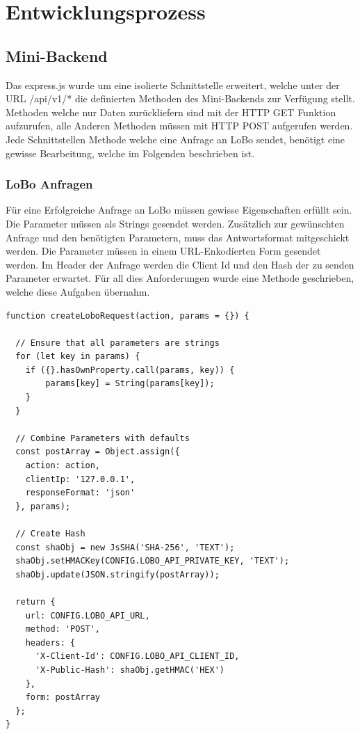 \section{Entwicklungsprozess}
\subsection{Mini-Backend}
Das express.js wurde um eine isolierte Schnittstelle erweitert, welche unter der URL /api/v1/* die definierten Methoden des Mini-Backends zur Verfügung stellt. Methoden welche nur Daten zurückliefern sind mit der HTTP GET Funktion aufzurufen, alle Anderen Methoden müssen mit HTTP POST aufgerufen werden. Jede Schnittstellen Methode welche eine Anfrage an LoBo sendet, benötigt eine gewisse Bearbeitung, welche im Folgenden beschrieben ist.

\subsubsection{LoBo Anfragen}
Für eine Erfolgreiche Anfrage an LoBo müssen gewisse Eigenschaften erfüllt sein. Die Parameter müssen als Strings gesendet werden. Zusätzlich zur gewünschten Anfrage und den benötigten Parametern, muss das Antwortsformat mitgeschickt werden. Die Parameter müssen in einem URL-Enkodierten Form gesendet werden. Im Header der Anfrage werden die Client Id und den Hash der zu senden Parameter erwartet. Für all dies Anforderungen wurde eine Methode geschrieben, welche diese Aufgaben übernahm.

\begin{lstlisting}[caption=Methode für LoBo Anfragen]
function createLoboRequest(action, params = {}) {

  // Ensure that all parameters are strings
  for (let key in params) {
    if ({}.hasOwnProperty.call(params, key)) {
        params[key] = String(params[key]);
    }
  }

  // Combine Parameters with defaults
  const postArray = Object.assign({
    action: action,
    clientIp: '127.0.0.1',
    responseFormat: 'json'
  }, params);

  // Create Hash
  const shaObj = new JsSHA('SHA-256', 'TEXT');
  shaObj.setHMACKey(CONFIG.LOBO_API_PRIVATE_KEY, 'TEXT');
  shaObj.update(JSON.stringify(postArray));

  return {
    url: CONFIG.LOBO_API_URL,
    method: 'POST',
    headers: {
      'X-Client-Id': CONFIG.LOBO_API_CLIENT_ID,
      'X-Public-Hash': shaObj.getHMAC('HEX')
    },
    form: postArray
  };
}
\end{lstlisting}

